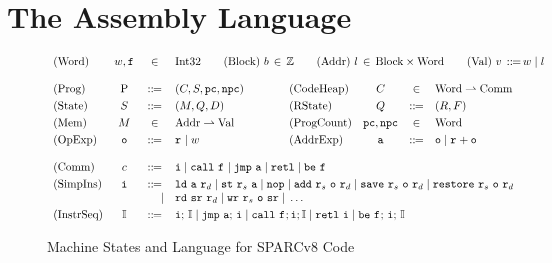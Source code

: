 \section{The \sparc{} Assembly Language}
\label{sec:modeling}
\begin{figure}[!t]
	\centering
	\small
	\[
		\begin{array}{lcclclccl}
			\TYPE{(Word)} & \word, \lab{} & \in &
			\multicolumn{6}{l}
			{
				\TYPE{Int32} \qquad
				\TYPE{(Block)} \ \block \, \in \, \Ztype
				\qquad
				\TYPE{(Addr)} \ \loc \, \in \,
					\TYPE{Block} \times \TYPE{Word}
				\qquad
				\TYPE{(Val)} \ \val \,
					\define \, \word \sepline \loc
			}
			\\
			\\
			\TYPE{(Prog)} & \prog & \define &
				(\code, \state, \pc, \npc) & \qquad &
			\TYPE{(CodeHeap)} & \ \code \ & \in &
				\TYPE{Word} \rightharpoonup \TYPE{Comm}
			\\
			\\[-9pt]
			\TYPE{(State)} & \state & \define &
				(\mem, \Rstate, \DBuf) & &
			\TYPE{(RState)} & \Rstate & \define &
				(\RFile, \Wstack)
			\\
			\\[-9pt]
			\TYPE{(Mem)} & \mem & \in &
				\TYPE{Addr} \rightharpoonup \TYPE{Val}
			& &
			\TYPE{(ProgCount)} & \pc, \npc & \in & \TYPE{Word}
			\\
			\\[-9pt]
			\TYPE{(OpExp)} & \oexp & \define &
				\reg{} \sepline \word & &
			\TYPE{(AddrExp)} & \aexp & \define &
				\oexp \sepline \reg{} + \oexp \\
			\\
			\TYPE{(Comm)} & \comm & \define &
			\multicolumn{6}{l}
			{
				\simplins{} \sepline \call{} \ \lab{}
				\sepline \jmp{} \ \aexp \sepline \retl{} \sepline
				\be \ \lab{}
			} \\
			\\[-9pt]
			\TYPE{(SimpIns)} & \simplins{} & \define &
			\multicolumn{6}{l}
			{
				\ld{} \ \aexp \ \reg{d} \sepline
				\st{} \ \reg{s} \ \aexp \sepline
				\nop{} \sepline
				\cadd{} \ \reg{s} \ \oexp \ \reg{d} \sepline
				\csave{} \ \reg{s} \ \oexp \ \reg{d} \sepline
				\crestore{} \ \reg{s} \ \oexp \ \reg{d}
			} \\
			& & \ \ \ \ | &
			\multicolumn{6}{l}
			{
				\rd{} \ \sr \ \reg{d} \sepline
				\cwr{} \ \reg{s} \ \oexp \ \sr \sepline
				\dots
			} \\
			\\[-9pt]
			\TYPE{(InstrSeq)} & \cblk & \define &
			\multicolumn{6}{l}
			{
				\simplins{}; \, \cblk \sepline
				\jmp{} \ \aexp; \, \simplins{} \sepline
				\call{} \ \lab{}; \simplins{}; \cblk \sepline
				\retl{} \ \simplins{} \sepline
				\be{} \ \lab{}; \, \simplins{}; \, \cblk
			}
		\end{array}
	\]
	\vspace*{-0.5em}
	\caption{Machine States and Language for SPARCv8 Code}
	\label {fig:Machine States and Language for SPARC Code}
	\vspace*{-0.5em}
\end{figure}

